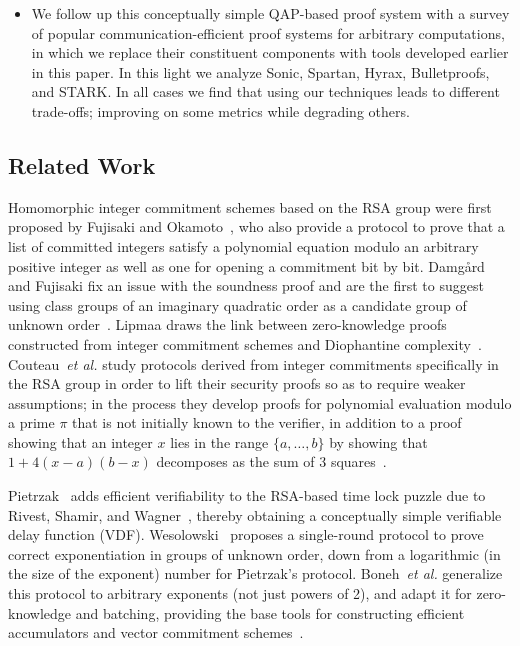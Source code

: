 \documentclass{article}
\begin{document}
\begin{itemize}
    \item[] We follow up this conceptually simple QAP-based proof system with a survey of popular communication-efficient proof systems for arbitrary computations, in which we replace their constituent components with tools developed earlier in this paper. In this light we analyze Sonic, Spartan, Hyrax, Bulletproofs, and STARK. In all cases we find that using our techniques leads to different trade-offs; improving on some metrics while degrading others.
\end{itemize}

\subsection{Related Work}

Homomorphic integer commitment schemes based on the RSA group were first proposed by Fujisaki and Okamoto~\cite{C:FujOka97}, who also provide a protocol to prove that a list of committed integers satisfy a polynomial equation modulo an arbitrary positive integer as well as one for opening a commitment bit by bit. Damgård and Fujisaki fix an issue with the soundness proof and are the first to suggest using class groups of an imaginary quadratic order as a candidate group of unknown order~\cite{AC:DamFuj02}. Lipmaa draws the link between zero-knowledge proofs constructed from integer commitment schemes and Diophantine complexity~\cite{AC:Lipmaa03b}. Couteau~\emph{et al.} study protocols derived from integer commitments specifically in the RSA group in order to lift their security proofs so as to require weaker assumptions; in the process they develop proofs for polynomial evaluation modulo a prime $\pi$ that is not initially known to the verifier, in addition to a proof showing that an integer $x$ lies in the range $\{a, \ldots, b\}$ by showing that $1+4(x-a)(b-x)$ decomposes as the sum of 3 squares~\cite{EC:CouPetPoi17}.

Pietrzak~\cite{Pietrzak18} adds efficient verifiability to the RSA-based time lock puzzle due to Rivest, Shamir, and Wagner~\cite{RivShaWag96}, thereby obtaining a conceptually simple verifiable delay function (VDF). Wesolowski~\cite{EC:Wesolowski19} proposes a single-round protocol to prove correct exponentiation in groups of unknown order, down from a logarithmic (in the size of the exponent) number for Pietrzak's protocol. Boneh~\emph{et al.} generalize this protocol to arbitrary exponents (not just powers of 2), and adapt it for zero-knowledge and batching, providing the base tools for constructing efficient accumulators and vector commitment schemes~\cite{C:BonBunFis19}.
\end{document}
